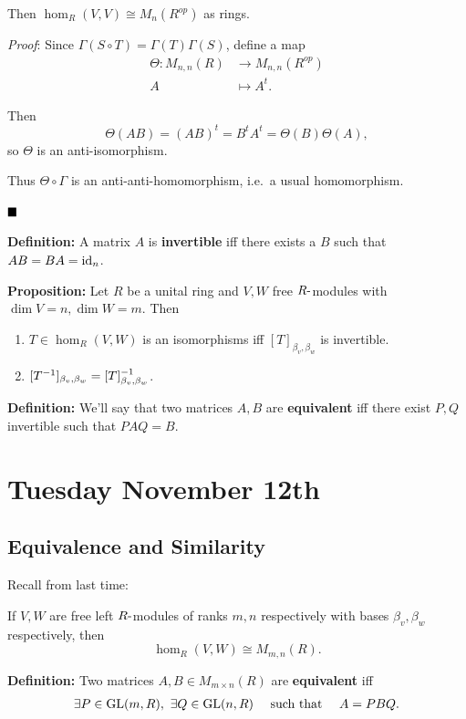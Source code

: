Then \(\hom_R(V, V) \cong M_n(R^{op})\) as rings.

\emph{Proof}: Since \(\Gamma(S \circ T) = \Gamma(T) \Gamma(S)\), define
a map \begin{align*}
\Theta: M_{n, n}(R) &\to M_{n, n}(R^{op}) \\
A &\mapsto A^t
.\end{align*}

Then \[
\Theta(AB) = (AB)^t = B^t A^t = \Theta(B) \Theta(A)
,\] so \(\Theta\) is an anti-isomorphism.

Thus \(\Theta\circ \Gamma\) is an anti-anti-homomorphism, i.e.~a usual
homomorphism.

\(\qed\)

\textbf{Definition:} A matrix \(A\) is \textbf{invertible} iff there
exists a \(B\) such that \(AB = BA = \text{id}_n\).

\textbf{Proposition:} Let \(R\) be a unital ring and \(V, W\) free
\(R{\hbox{-}}\)modules with \(\dim V = n, \dim W = m\). Then

\begin{enumerate}
\def\labelenumi{\arabic{enumi}.}
\item
  \(T \in \hom_R(V, W)\) is an isomorphisms iff
  \([T]_{\beta_v, \beta_w}\) is invertible.
\item
  \([T^{-1}]_{\beta_v, \beta_w} = [T]_{\beta_v, \beta_w}^{-1}\).
\end{enumerate}

\textbf{Definition:} We'll say that two matrices \(A, B\) are
\textbf{equivalent} iff there exist \(P, Q\) invertible such that
\(PAQ = B\).

\hypertarget{tuesday-november-12th}{%
\section{Tuesday November 12th}\label{tuesday-november-12th}}

\hypertarget{equivalence-and-similarity}{%
\subsection{Equivalence and
Similarity}\label{equivalence-and-similarity}}

Recall from last time:

If \(V, W\) are free left \(R{\hbox{-}}\)modules of ranks \(m,n\)
respectively with bases \(\beta_v, \beta_w\) respectively, then \[
\hom_R(V, W) \cong M_{m, n}(R)
.\]

\textbf{Definition:} Two matrices \(A, B \in M_{m \times n}(R)\) are
\textbf{equivalent} iff \begin{align*}
\exists P \in {\text{GL}}(m, R),~ \exists Q \in {\text{GL}}(n, R)
\quad \text{ such that } \quad
A = PBQ
.\end{align*}

